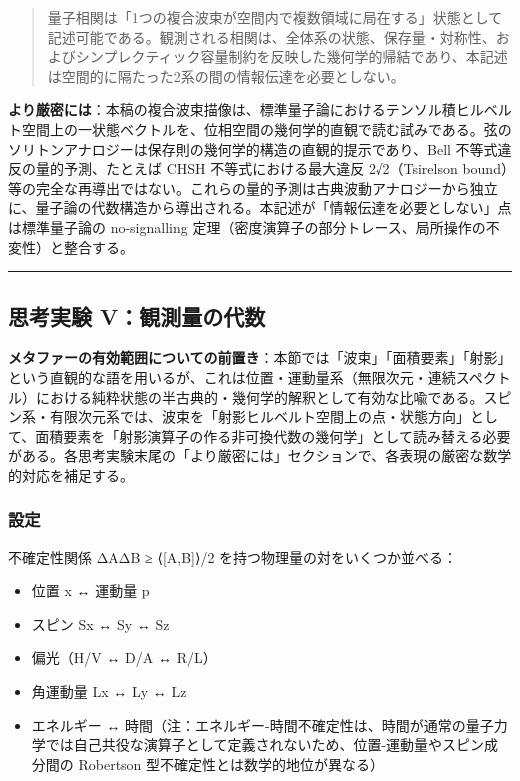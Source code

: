 \documentclass[
  11pt,
]{ltjsarticle}
\providecommand{\tightlist}{%
  \setlength{\itemsep}{0pt}\setlength{\parskip}{0pt}}
\begin{document}
\begin{quote}
量子相関は「1つの複合波束が空間内で複数領域に局在する」状態として記述可能である。観測される相関は、全体系の状態、保存量・対称性、およびシンプレクティック容量制約を反映した幾何学的帰結であり、本記述は空間的に隔たった2系の間の情報伝達を必要としない。
\end{quote}

\textbf{より厳密には}：本稿の複合波束描像は、標準量子論におけるテンソル積ヒルベルト空間上の一状態ベクトルを、位相空間の幾何学的直観で読む試みである。弦のソリトンアナロジーは保存則の幾何学的構造の直観的提示であり、Bell
不等式違反の量的予測、たとえば CHSH 不等式における最大違反
2√2（Tsirelson
bound）等の完全な再導出ではない。これらの量的予測は古典波動アナロジーから独立に、量子論の代数構造から導出される。本記述が「情報伝達を必要としない」点は標準量子論の
no-signalling
定理（密度演算子の部分トレース、局所操作の不変性）と整合する。

\begin{center}\rule{0.5\linewidth}{0.5pt}\end{center}

\subsection{思考実験
V：観測量の代数}\label{ux601dux8003ux5b9fux9a13-vux89b3ux6e2cux91cfux306eux4ee3ux6570}

\textbf{メタファーの有効範囲についての前置き}：本節では「波束」「面積要素」「射影」という直観的な語を用いるが、これは位置・運動量系（無限次元・連続スペクトル）における純粋状態の半古典的・幾何学的解釈として有効な比喩である。スピン系・有限次元系では、波束を「射影ヒルベルト空間上の点・状態方向」として、面積要素を「射影演算子の作る非可換代数の幾何学」として読み替える必要がある。各思考実験末尾の「より厳密には」セクションで、各表現の厳密な数学的対応を補足する。

\subsubsection{設定}\label{ux8a2dux5b9a-4}

不確定性関係 ΔAΔB ≥ \textbar⟨{[}A,B{]}⟩\textbar/2
を持つ物理量の対をいくつか並べる：

\begin{itemize}
\tightlist
\item
  位置 x ↔ 運動量 p
\item
  スピン Sx ↔ Sy ↔ Sz
\item
  偏光（H/V ↔ D/A ↔ R/L）
\item
  角運動量 Lx ↔ Ly ↔ Lz
\item
  エネルギー ↔
  時間（注：エネルギー-時間不確定性は、時間が通常の量子力学では自己共役な演算子として定義されないため、位置-運動量やスピン成分間の
  Robertson 型不確定性とは数学的地位が異なる）
\end{itemize}
\end{document}
